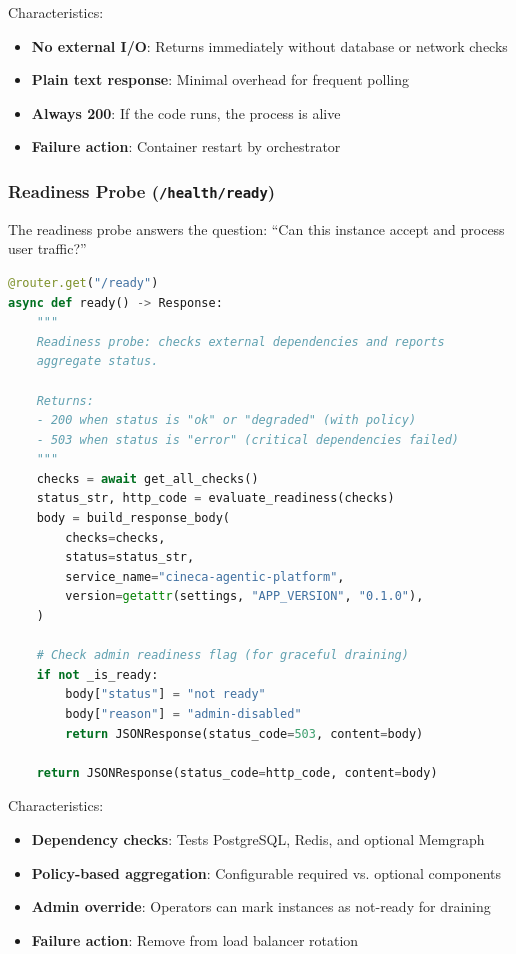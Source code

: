 Characteristics:
\begin{itemize}
    \item \textbf{No external I/O}: Returns immediately without database or network checks
    \item \textbf{Plain text response}: Minimal overhead for frequent polling
    \item \textbf{Always 200}: If the code runs, the process is alive
    \item \textbf{Failure action}: Container restart by orchestrator
\end{itemize}

\subsubsection{Readiness Probe (\texttt{/health/ready})}

The readiness probe answers the question: ``Can this instance accept and process user traffic?''

\begin{lstlisting}[language=Python, caption={Readiness probe implementation}]
@router.get("/ready")
async def ready() -> Response:
    """
    Readiness probe: checks external dependencies and reports 
    aggregate status.
    
    Returns:
    - 200 when status is "ok" or "degraded" (with policy)
    - 503 when status is "error" (critical dependencies failed)
    """
    checks = await get_all_checks()
    status_str, http_code = evaluate_readiness(checks)
    body = build_response_body(
        checks=checks,
        status=status_str,
        service_name="cineca-agentic-platform",
        version=getattr(settings, "APP_VERSION", "0.1.0"),
    )
    
    # Check admin readiness flag (for graceful draining)
    if not _is_ready:
        body["status"] = "not ready"
        body["reason"] = "admin-disabled"
        return JSONResponse(status_code=503, content=body)
    
    return JSONResponse(status_code=http_code, content=body)
\end{lstlisting}

Characteristics:
\begin{itemize}
    \item \textbf{Dependency checks}: Tests PostgreSQL, Redis, and optional Memgraph
    \item \textbf{Policy-based aggregation}: Configurable required vs. optional components
    \item \textbf{Admin override}: Operators can mark instances as not-ready for draining
    \item \textbf{Failure action}: Remove from load balancer rotation
\end{itemize}

